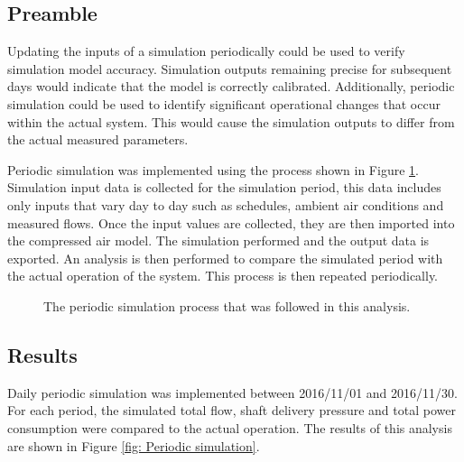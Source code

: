 	\subsection{Preamble}
	Updating the inputs of a simulation periodically could be used to verify simulation model accuracy. Simulation outputs remaining precise for subsequent days would indicate that the model is correctly calibrated. Additionally, periodic simulation could be used to identify significant operational changes that occur within the actual system. This would cause the simulation outputs to differ from the actual measured parameters. 
	\par 
	Periodic simulation was implemented using the process shown in Figure \ref{fig: PeriodicProcess}. Simulation input data is collected for the simulation period, this data includes only inputs that vary day to day such as schedules, ambient air conditions and  measured flows. Once the input values are collected, they are then imported into the compressed air model. The simulation performed and the output data is exported. An analysis is then performed to compare the simulated period with the actual operation of the system. This process is then repeated periodically.
		\begin{figure}[h]
		\centering
		\caption{The periodic simulation process that was followed in this analysis.}
		\label{fig: PeriodicProcess}
	\end{figure}	
	     \subsection{Results}
	     Daily periodic simulation was implemented between 2016/11/01 and 2016/11/30. For each period, the simulated total flow, shaft delivery pressure and total power consumption were compared to the actual operation. The results of this analysis are shown in Figure \ref{fig: Periodic simulation}.
	     \par 
	     
